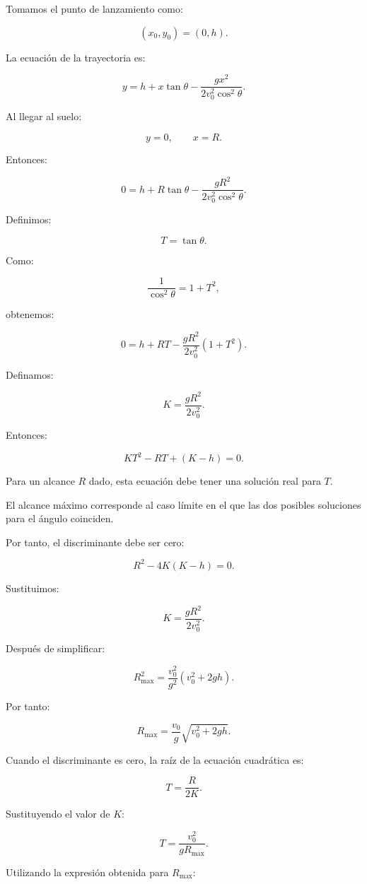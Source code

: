 \begin{explicacion}
Tomamos el punto de lanzamiento como:

\[
(x_0,y_0)=(0,h).
\]

La ecuación de la trayectoria es:

\[
y
=
h
+
x\tan\theta
-
\frac{
gx^2
}{
2v_0^2\cos^2\theta
}.
\]

Al llegar al suelo:

\[
y=0,
\qquad
x=R.
\]

Entonces:

\[
0
=
h
+
R\tan\theta
-
\frac{
gR^2
}{
2v_0^2\cos^2\theta
}.
\]

Definimos:

\[
T=\tan\theta.
\]

Como:

\[
\frac{1}{\cos^2\theta}
=
1+T^2,
\]

obtenemos:

\[
0
=
h
+
RT
-
\frac{
gR^2
}{
2v_0^2
}
(1+T^2).
\]

Definamos:

\[
K
=
\frac{
gR^2
}{
2v_0^2
}.
\]

Entonces:

\[
KT^2
-
RT
+
(K-h)
=
0.
\]

Para un alcance \(R\) dado, esta ecuación debe tener una solución real para
\(T\).

El alcance máximo corresponde al caso límite en el que las dos posibles
soluciones para el ángulo coinciden.

Por tanto, el discriminante debe ser cero:

\[
R^2
-
4K(K-h)
=
0.
\]

Sustituimos:

\[
K
=
\frac{
gR^2
}{
2v_0^2
}.
\]

Después de simplificar:

\[
R_{\max}^2
=
\frac{
v_0^2
}{
g^2
}
\left(
v_0^2+2gh
\right).
\]

Por tanto:

\[
\boxed{
R_{\max}
=
\frac{v_0}{g}
\sqrt{
v_0^2+2gh
}
}.
\]

Cuando el discriminante es cero, la raíz de la ecuación cuadrática es:

\[
T
=
\frac{R}{2K}.
\]

Sustituyendo el valor de \(K\):

\[
T
=
\frac{
v_0^2
}{
gR_{\max}
}.
\]

Utilizando la expresión obtenida para \(R_{\max}\):


\end{explicacion}

